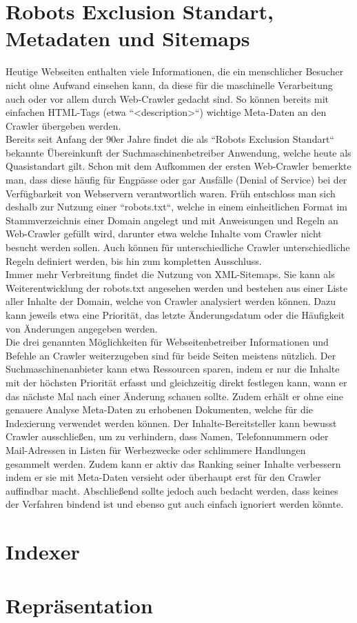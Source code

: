 \section{Robots Exclusion Standart, Metadaten und Sitemaps}
Heutige Webseiten enthalten viele Informationen, die ein menschlicher Besucher nicht ohne Aufwand einsehen kann, da diese für die maschinelle Verarbeitung auch oder vor allem durch Web-Crawler gedacht sind. So können bereits mit einfachen HTML-Tags (etwa ``<description>``) wichtige Meta-Daten an den Crawler übergeben werden.\\
Bereits seit Anfang der 90er Jahre findet die als ``Robots Exclusion Standart`` bekannte Übereinkunft der Suchmaschinenbetreiber Anwendung, welche heute als Quasistandart gilt. Schon mit dem Aufkommen der ersten Web-Crawler bemerkte man, dass diese häufig für Engpässe oder gar Ausfälle (Denial of Service) bei der Verfügbarkeit von Webservern verantwortlich waren. Früh entschloss man sich deshalb zur Nutzung einer ``robots.txt``, welche in einem einheitlichen Format im Stammverzeichnis einer Domain angelegt und mit Anweisungen und Regeln an Web-Crawler gefüllt wird, darunter etwa welche Inhalte vom Crawler nicht besucht werden sollen. Auch können für unterschiedliche Crawler unterschiedliche Regeln definiert werden, bis hin zum kompletten Ausschluss.\\
Immer mehr Verbreitung findet die Nutzung von XML-Sitemaps. Sie kann als Weiterentwicklung der robots.txt angesehen werden und bestehen aus einer Liste aller Inhalte der Domain, welche von Crawler analysiert werden können. Dazu kann jeweils etwa eine Priorität, das letzte Änderungsdatum oder die Häufigkeit von Änderungen angegeben werden.\\
Die drei genannten Möglichkeiten für Webseitenbetreiber Informationen und Befehle an Crawler weiterzugeben sind für beide Seiten meistens nützlich. Der Suchmaschinenanbieter kann etwa Ressourcen sparen, indem er nur die Inhalte mit der höchsten Priorität erfasst und gleichzeitig direkt festlegen kann, wann er das nächste Mal nach einer Änderung schauen sollte. Zudem erhält er ohne eine genauere Analyse Meta-Daten zu erhobenen Dokumenten, welche für die Indexierung verwendet werden können. Der Inhalte-Bereitsteller kann bewusst Crawler ausschließen, um zu verhindern, dass Namen, Telefonnummern oder Mail-Adressen in Listen für Werbezwecke oder schlimmere Handlungen gesammelt werden. Zudem kann er aktiv das Ranking seiner Inhalte verbessern indem er sie mit Meta-Daten versieht oder überhaupt erst für den Crawler auffindbar macht. Abschließend sollte jedoch auch bedacht werden, dass keines der Verfahren bindend ist und ebenso gut auch einfach ignoriert werden könnte.

\section{Indexer}

\section{Repräsentation}